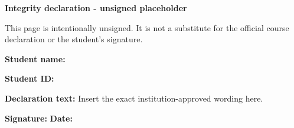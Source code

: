 \documentclass[12pt]{article}
\begin{document}
\begin{center}
{\Large\bfseries Integrity declaration - unsigned placeholder}\par
\vspace{10mm}
This page is intentionally unsigned. It is not a substitute for the official
course declaration or the student's signature.
\end{center}
\vspace{18mm}
\textbf{Student name:} \hrulefill

\vspace{14mm}
\textbf{Student ID:} \hrulefill

\vspace{14mm}
\textbf{Declaration text:} Insert the exact institution-approved wording here.

\vfill
\textbf{Signature:} \hrulefill \hspace{10mm} \textbf{Date:} \hrulefill
\end{document}
